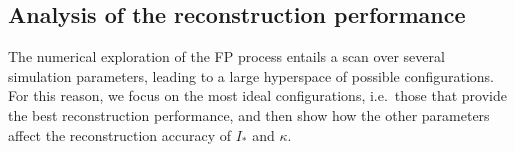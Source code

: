 
\subsection{Analysis of the reconstruction performance}


The numerical exploration of the FP process entails a scan over several simulation parameters, leading to a large hyperspace of possible configurations. For this reason, we focus on the most ideal configurations, i.e.\ those that provide the best reconstruction performance, and then show how the other parameters affect the reconstruction accuracy of $I_\ast$ and $\kappa$.

